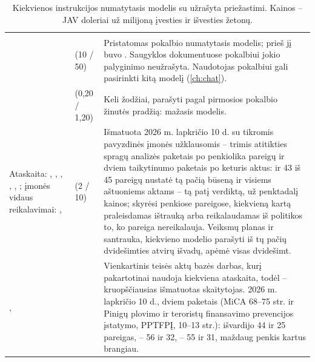 \begin{xltabular}{\textwidth}{@{}L{36mm}L{40mm}Y@{}}
\caption{Kiekvienos instrukcijos numatytasis modelis su užrašyta priežastimi. Kainos -- JAV doleriai už milijoną įvesties ir išvesties žetonų.}\label{tab:models:defaults}\\
\toprule
{} &  &  \\
\midrule
\endfirsthead
\toprule
{} &  &  \\
\midrule
\endhead
\bottomrule
\endlastfoot
{} &  (10 / 50) & Pristatomas pokalbio numatytasis modelis; prieš jį buvo . Saugyklos dokumentuose pokalbiui jokio palyginimo neužrašyta. Naudotojas pokalbiui gali pasirinkti kitą modelį (\cref{ch:chat}). \\
 &  (0,20 / 1,20) & Keli žodžiai, parašyti pagal pirmosios pokalbio žinutės pradžią: mažasis modelis. \\
Ataskaita: , , , , , ; įmonės vidaus reikalavimai: ,  &  (2 / 10) & Išmatuota 2026 m. lapkričio 10 d. su tikromis pavyzdinės įmonės užklausomis -- trimis atitikties spragų analizės paketais po penkiolika pareigų ir dviem taikytinumo paketais po keturis aktus:  ir  43 iš 45 pareigų nustatė tą pačią būseną ir visiems aštuoniems aktams -- tą patį verdiktą, už penktadalį kainos;  skyrėsi penkiose pareigose, kiekvieną kartą praleisdamas ištrauką arba reikalaudamas iš politikos to, ko pareiga nereikalauja. Veiksmų planas ir santrauka, kiekvieno modelio parašyti iš tų pačių dvidešimties atvirų išvadų, apėmė visas dvidešimt. \\
,  &  & Vienkartinis teisės aktų bazės darbas, kurį pakartotinai naudoja kiekviena ataskaita, todėl -- kruopščiausias išmatuotas skaitytojas. 2026 m. lapkričio 10 d., dviem paketais (MiCA 68--75 str. ir Pinigų plovimo ir teroristų finansavimo prevencijos įstatymo, PPTFPĮ, 10--13 str.):  išvardijo 44 ir 25 pareigas,  -- 56 ir 32,  -- 55 ir 31, maždaug penkis kartus brangiau. \\

\end{xltabular}
